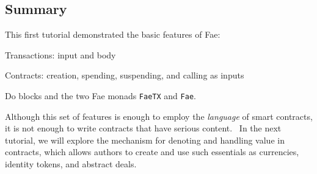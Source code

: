 \documentclass[11pt]{article}
\begin{document}
\subsection{Summary}
\vspace{5.5pt}

This first tutorial demonstrated the basic features of Fae:


\vspace{5.5pt}\begin{longitem}
\item{Transactions: input and body}
\item{Contracts: creation, spending, suspending, and calling as inputs}
\item{Do blocks and the two Fae monads \texttt{FaeTX} and \texttt{Fae}.}
\end{longitem}

\vspace{11pt}

Although this set of features is enough to employ the \textit{language} of smart contracts, it is not enough to write contracts that have serious content.  In the next tutorial, we will explore the mechanism for denoting and handling value in contracts, which allows authors to create and use such essentials as currencies, identity tokens, and abstract deals.
\end{document}
